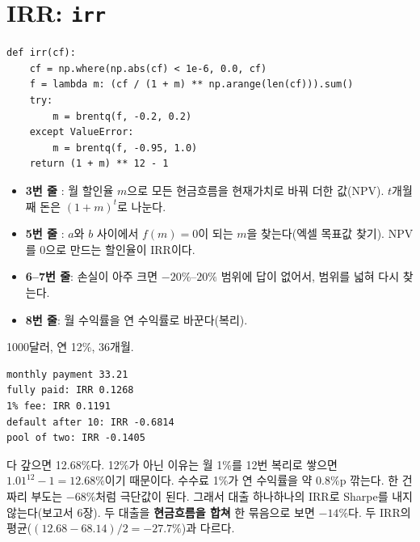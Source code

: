 \section{IRR: \texttt{irr}}
\begin{lstlisting}
def irr(cf):
    cf = np.where(np.abs(cf) < 1e-6, 0.0, cf)
    f = lambda m: (cf / (1 + m) ** np.arange(len(cf))).sum()
    try:
        m = brentq(f, -0.2, 0.2)
    except ValueError:
        m = brentq(f, -0.95, 1.0)
    return (1 + m) ** 12 - 1
\end{lstlisting}
\begin{itemize}[leftmargin=*]
\item \textbf{3번 줄} : 월 할인율 $m$으로 모든 현금흐름을 현재가치로 바꿔 더한 값(NPV). $t$개월째 돈은 $(1+m)^t$로 나눈다.
\item \textbf{5번 줄} : $a$와 $b$ 사이에서 $f(m)=0$이 되는 $m$을 찾는다(엑셀 목표값 찾기). NPV를 0으로 만드는 할인율이 IRR이다.
\item \textbf{6--7번 줄}: 손실이 아주 크면 $-20\%$--$20\%$ 범위에 답이 없어서, 범위를 넓혀 다시 찾는다.
\item \textbf{8번 줄}: 월 수익률을 연 수익률로 바꾼다(복리).
\end{itemize}
\begin{workout}
1000달러, 연 12\%, 36개월.
\begin{lstlisting}[style=out]
monthly payment 33.21
fully paid: IRR 0.1268
1% fee: IRR 0.1191
default after 10: IRR -0.6814
pool of two: IRR -0.1405
\end{lstlisting}
 다 갚으면 12.68\%다. 12\%가 아닌 이유는 월 1\%를 12번 복리로 쌓으면 $1.01^{12}-1=12.68\%$이기 때문이다.
 수수료 1\%가 연 수익률을 약 0.8\%p 깎는다.
 한 건짜리 부도는 $-68\%$처럼 극단값이 된다. 그래서 대출 하나하나의 IRR로 Sharpe를 내지 않는다(보고서 6장).
 두 대출을 \textbf{현금흐름을 합쳐} 한 묶음으로 보면 $-14\%$다. 두 IRR의 평균($(12.68-68.14)/2=-27.7\%$)과 다르다.
\end{workout}

